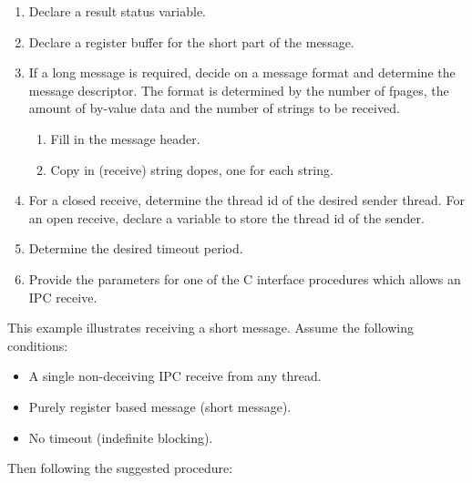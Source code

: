 \begin{enumerate}

\item Declare a result status variable.

\item Declare a register buffer for the short part of the message.

\item If a long message is required, decide on a message format and
  determine the message descriptor. The format is determined by the
  number of fpages, the amount of by-value data and the number of
  strings to be received.
        
  \begin{enumerate}

  \item Fill in the message header.
  \item Copy in (receive) string dopes, one for each string.

  \end{enumerate}

\item For a closed receive, determine the thread id of the desired
  sender thread. For an open receive, declare a variable to store the
  thread id of the sender.
  
\item Determine the desired timeout period.

\item Provide the parameters for one of the C interface procedures
  which allows an IPC receive.

\end{enumerate}


This example illustrates receiving a short message. Assume the
following conditions:

\begin{itemize}

\item A single non-deceiving IPC receive from any thread.
\item Purely register based message (short message).
\item No timeout (indefinite blocking).

\end{itemize}

Then following the suggested procedure:

